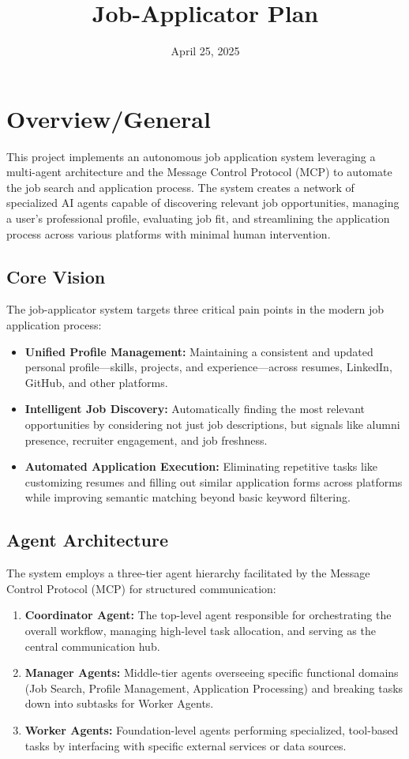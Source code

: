 \documentclass[a4paper,12pt]{article}
\title{Job-Applicator Plan}
\date{April 25, 2025}
\begin{document}
\maketitle
\tableofcontents
\newpage

\section{Overview/General}
This project implements an autonomous job application system leveraging a multi-agent architecture and the Message Control Protocol (MCP) to automate the job search and application process. The system creates a network of specialized AI agents capable of discovering relevant job opportunities, managing a user's professional profile, evaluating job fit, and streamlining the application process across various platforms with minimal human intervention.

\subsection{Core Vision}
The job-applicator system targets three critical pain points in the modern job application process:

\begin{itemize}
    \item \textbf{Unified Profile Management:} Maintaining a consistent and updated personal profile—skills, projects, and experience—across resumes, LinkedIn, GitHub, and other platforms.
    \item \textbf{Intelligent Job Discovery:} Automatically finding the most relevant opportunities by considering not just job descriptions, but signals like alumni presence, recruiter engagement, and job freshness.
    \item \textbf{Automated Application Execution:} Eliminating repetitive tasks like customizing resumes and filling out similar application forms across platforms while improving semantic matching beyond basic keyword filtering.
\end{itemize}

\subsection{Agent Architecture}
The system employs a three-tier agent hierarchy facilitated by the Message Control Protocol (MCP) for structured communication:

\begin{enumerate}
    \item \textbf{Coordinator Agent:} The top-level agent responsible for orchestrating the overall workflow, managing high-level task allocation, and serving as the central communication hub.
    \item \textbf{Manager Agents:} Middle-tier agents overseeing specific functional domains (Job Search, Profile Management, Application Processing) and breaking tasks down into subtasks for Worker Agents.
    \item \textbf{Worker Agents:} Foundation-level agents performing specialized, tool-based tasks by interfacing with specific external services or data sources.
\end{enumerate}
\end{document}
